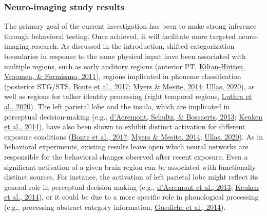 \documentclass[
  11pt,
  english,
  man,floatsintext]{apa6}
\begin{document}
\hypertarget{neuro-imaging-study-results}{%
\subsubsection{Neuro-imaging study results}\label{neuro-imaging-study-results}}

The primary goal of the current investigation has been to make strong inference through behavioral testing. Once achieved, it will facilitate more targeted neuro-imaging research. As discussed in the introduction, shifted categorization boundaries in response to the same physical input have been associated with multiple regions, such as early auditory regions (anterior PT, \protect\hyperlink{ref-kilianhutten2011}{Kilian-Hütten, Vroomen, \& Formisano, 2011}), regions implicated in phoneme classification (posterior STG/STS, \protect\hyperlink{ref-bonte2017}{Bonte et al., 2017}; \protect\hyperlink{ref-myers-mesite2014}{Myers \& Mesite, 2014}; \protect\hyperlink{ref-ullas2020}{Ullas, 2020}), as well as regions for talker identity processing (right temporal regions, \protect\hyperlink{ref-luthra2020a}{Luthra et al., 2020}). The left parietal lobe and the insula, which are implicated in perceptual decision-making (e.g., \protect\hyperlink{ref-dacremont2013}{d'Acremont, Schultz, \& Bossaerts, 2013}; \protect\hyperlink{ref-keuken2014}{Keuken et al., 2014}), have also been shown to exhibit distinct activation for different exposure conditions (\protect\hyperlink{ref-bonte2017}{Bonte et al., 2017}; \protect\hyperlink{ref-myers-mesite2014}{Myers \& Mesite, 2014}; \protect\hyperlink{ref-ullas2020}{Ullas, 2020}). As in behavioral experiments, existing results leave open which neural networks are responsible for the behavioral changes observed after recent exposure. Even a significant activation of a given brain region can be associated with functionally-distinct sources. For instance, the activation of left parietal lobe might reflect its general role in perceptual decision making (e.g., \protect\hyperlink{ref-dacremont2013}{d'Acremont et al., 2013}; \protect\hyperlink{ref-keuken2014}{Keuken et al., 2014}), or it could be due to a more specific role in phonological processing (e.g., processing abstract category information, \protect\hyperlink{ref-guediche2014}{Guediche et al., 2014}).
\end{document}
